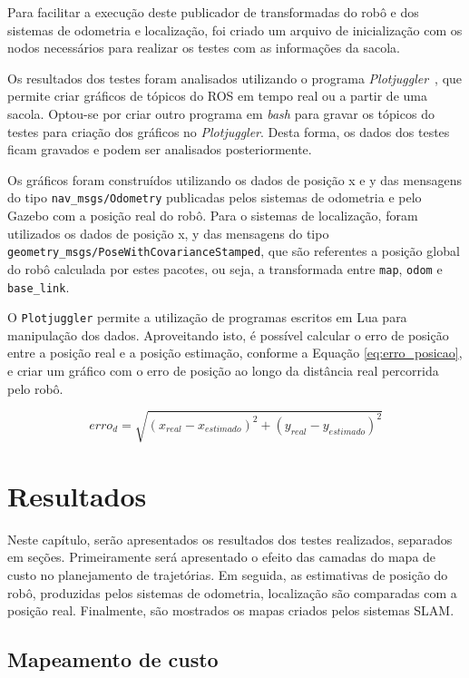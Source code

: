 \documentclass[repeatfields,xlists,xpacks,oneside,yearsonly]{ufrgscca}
\begin{document}
Para facilitar a execução deste publicador de transformadas do robô e
dos sistemas de odometria e localização, foi criado um arquivo de
inicialização com os nodos necessários para realizar os testes com as
informações da sacola.

Os resultados dos testes foram analisados utilizando o programa
\textit{Plotjuggler}~\cite{plotjuggler}, que permite criar gráficos
de tópicos do ROS em tempo real ou a partir de uma sacola. Optou-se
por criar outro programa em \textit{bash} para gravar os tópicos do
testes para criação dos gráficos no \textit{Plotjuggler}. Desta
forma, os dados dos testes ficam gravados e podem ser analisados
posteriormente.

Os gráficos foram construídos utilizando os dados de posição x e y
das mensagens do tipo \texttt{nav\_msgs/Odometry} publicadas pelos
sistemas de odometria e pelo Gazebo com a posição real do robô. Para
o sistemas de localização, foram utilizados os dados de posição x, y
das mensagens do tipo
\texttt{geometry\_msgs/PoseWithCovarianceStamped}, que são referentes
a posição global do robô calculada por estes pacotes, ou seja, a
transformada entre \texttt{map}, \texttt{odom} e \texttt{base\_link}.

O \texttt{Plotjuggler} permite a utilização de programas escritos em
Lua para manipulação dos dados. Aproveitando isto, é possível
calcular o erro de posição entre a posição real e a posição
estimação, conforme a Equação \ref{eq:erro_posicao}, e criar um
gráfico com o erro de posição ao longo da distância real percorrida
pelo robô.

\begin{equation}
    \label{eq:erro_posicao}
    erro_d = \sqrt{(x_{real} - x_{estimado})^2 + (y_{real} - y_{estimado})^2}
\end{equation}


\chapter{Resultados}
\label{resultados}

Neste capítulo, serão apresentados os resultados dos testes
realizados, separados em seções. Primeiramente será apresentado o
efeito das camadas do mapa de custo no planejamento de trajetórias.
Em seguida, as estimativas de posição do robô, produzidas pelos
sistemas de odometria, localização são comparadas com a posição real.
Finalmente, são mostrados os mapas criados pelos sistemas SLAM.

\section{Mapeamento de custo}
\end{document}
